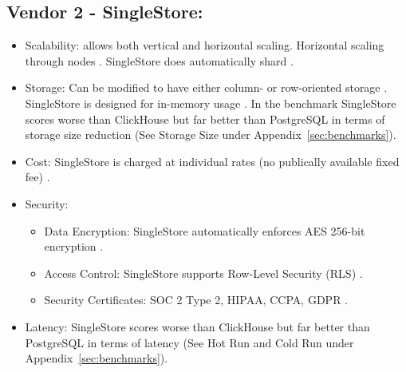 \subsection{Vendor 2 - SingleStore:}
\begin{itemize}
    \item Scalability: allows both vertical and horizontal scaling. Horizontal scaling through nodes \cite{singlestoreScaling}. SingleStore does automatically shard \cite{SinglestoreSharding}.
    \item Storage: Can be modified to have either column- or row-oriented storage \cite{singlestoreStorage}. SingleStore is designed for in-memory usage \cite{singlestoreStorage}.
    In the benchmark SingleStore scores worse than ClickHouse but far better than PostgreSQL in terms of storage size reduction (See Storage Size under Appendix~\ref{sec:benchmarks}).
    \item Cost: SingleStore is charged at individual rates (no publically available fixed fee) \cite{singleStoreCost}.
    \item Security: 
    \begin{itemize}
        \item Data Encryption: SingleStore automatically enforces AES 256-bit encryption \cite{singlestoreSecurity}.
        \item Access Control: SingleStore supports Row-Level Security (RLS) \cite{singlestoreSecurity2}.
        \item Security Certificates: SOC 2 Type 2, HIPAA, CCPA, GDPR \cite{singlestoreSecurity3}.
    \end{itemize}
    \item Latency: SingleStore scores worse than ClickHouse but far better than PostgreSQL in terms of latency (See Hot Run and Cold Run under Appendix~\ref{sec:benchmarks}).
\end{itemize} 
